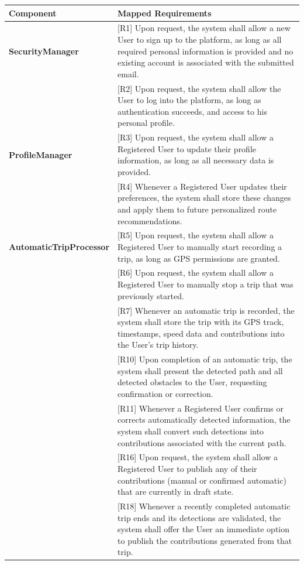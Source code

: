 \begin{center}
\begin{longtable}{p{0.30\linewidth}p{0.70\linewidth}}
\hline
\textbf{Component} & \textbf{Mapped Requirements} \\
\hline

\textbf{SecurityManager} &
[R1] Upon request, the system shall allow a new User to sign up to the platform, as long as all required personal information is provided and no existing account is associated with the submitted email. \\
& [R2] Upon request, the system shall allow the User to log into the platform, as long as authentication succeeds, and access to his personal profile. \\
\hline


\textbf{ProfileManager} &
[R3] Upon request, the system shall allow a Registered User to update their profile information, as long as all necessary data is provided. \\
& [R4] Whenever a Registered User updates their preferences, the system shall store these changes and apply them to future personalized route recommendations. \\
\hline

\textbf{AutomaticTripProcessor} &
[R5] Upon request, the system shall allow a Registered User to manually start recording a trip, as long as GPS permissions are granted. \\
& [R6] Upon request, the system shall allow a Registered User to manually stop a trip that was previously started. \\
& [R7] Whenever an automatic trip is recorded, the system shall store the trip with its GPS track, timestamps, speed data and contributions into the User’s trip history. \\
& [R10] Upon completion of an automatic trip, the system shall present the detected path and all detected obstacles to the User, requesting confirmation or correction. \\
& [R11] Whenever a Registered User confirms or corrects automatically detected information, the system shall convert such detections into contributions associated with the current path. \\
& [R16] Upon request, the system shall allow a Registered User to publish any of their contributions (manual or confirmed automatic) that are currently in draft state. \\
& [R18] Whenever a recently completed automatic trip ends and its detections are validated, the system shall offer the User an immediate option to publish the contributions generated from that trip. \\
\hline


\end{longtable}
\end{center}
